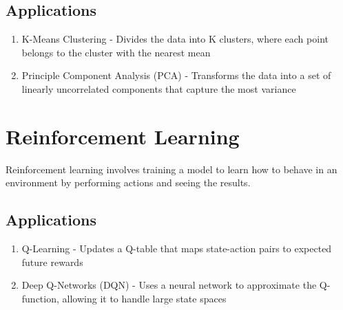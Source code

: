 \documentclass{article}
\begin{document}
\subsection*{Applications}

\begin{enumerate}
    \item K-Means Clustering - Divides the data into K clusters, where each point belongs to the cluster with the nearest mean
    \item Principle Component Analysis (PCA) - Transforms the data into a set of linearly uncorrelated components that capture the most variance
\end{enumerate}

\section*{Reinforcement Learning}

Reinforcement learning involves training a model to learn how to behave in an environment by performing actions and seeing the results.

\subsection*{Applications}

\begin{enumerate}
    \item Q-Learning - Updates a Q-table that maps state-action pairs to expected future rewards
    \item Deep Q-Networks (DQN) - Uses a neural network to approximate the Q-function, allowing it to handle large state spaces
\end{enumerate}
\end{document}
